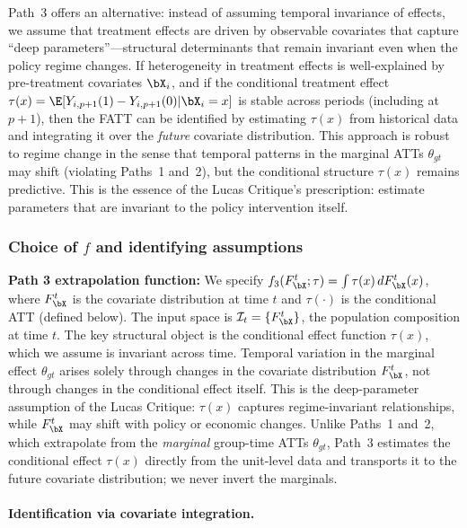 \documentclass{article}
\begin{document}
Path~3 offers an alternative: instead of assuming temporal invariance of effects, we assume that treatment effects are driven by observable covariates that capture ``deep parameters''---structural determinants that remain invariant even when the policy regime changes. If heterogeneity in treatment effects is well-explained by pre-treatment covariates $\bX_i$, and if the conditional treatment effect $\tau(x) = \E[Y_{i,p+1}(1) - Y_{i,p+1}(0) | \bX_i = x]$ is stable across periods (including at $p+1$), then the FATT can be identified by estimating $\tau(x)$ from historical data and integrating it over the \emph{future} covariate distribution. This approach is robust to regime change in the sense that temporal patterns in the marginal ATTs $\theta_{gt}$ may shift (violating Paths~1 and~2), but the conditional structure $\tau(x)$ remains predictive. This is the essence of the Lucas Critique's prescription: estimate parameters that are invariant to the policy intervention itself.

\subsubsection{Choice of $f$ and identifying assumptions}

\textbf{Path 3 extrapolation function:} We specify $f_3(F_{\bX}^t; \tau) = \int \tau(x) \, dF_{\bX}^t(x)$, where $F_{\bX}^t$ is the covariate distribution at time $t$ and $\tau(\cdot)$ is the conditional ATT (defined below). The input space is $\mathcal{I}_t = \{F_{\bX}^t\}$, the population composition at time $t$. The key structural object is the conditional effect function $\tau(x)$, which we assume is invariant across time. Temporal variation in the marginal effect $\theta_{gt}$ arises solely through changes in the covariate distribution $F_{\bX}^t$, not through changes in the conditional effect itself. This is the deep-parameter assumption of the Lucas Critique: $\tau(x)$ captures regime-invariant relationships, while $F_{\bX}^t$ may shift with policy or economic changes. Unlike Paths~1 and~2, which extrapolate from the \emph{marginal} group-time ATTs $\theta_{gt}$, Path~3 estimates the conditional effect $\tau(x)$ directly from the unit-level data and transports it to the future covariate distribution; we never invert the marginals.

\paragraph{Identification via covariate integration.}
\end{document}
